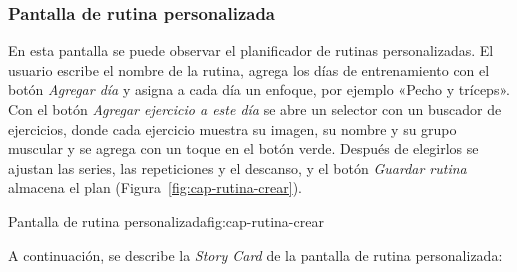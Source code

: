 \subsubsection{Pantalla de rutina personalizada}

En esta pantalla se puede observar el planificador de rutinas personalizadas.
El usuario escribe el nombre de la rutina, agrega los días de entrenamiento con
el botón \emph{Agregar día} y asigna a cada día un enfoque, por ejemplo «Pecho
y tríceps». Con el botón \emph{Agregar ejercicio a este día} se abre un
selector con un buscador de ejercicios, donde cada ejercicio muestra su imagen,
su nombre y su grupo muscular y se agrega con un toque en el botón verde.
Después de elegirlos se ajustan las series, las repeticiones y el descanso, y
el botón \emph{Guardar rutina} almacena el plan (Figura~\ref{fig:cap-rutina-crear}).

  {Pantalla de rutina personalizada}{fig:cap-rutina-crear}

A continuación, se describe la \emph{Story Card} de la pantalla de rutina personalizada:

